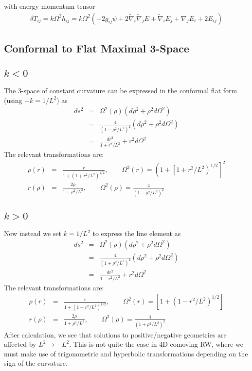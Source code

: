 \documentclass[10pt,letterpaper]{article}
\numberwithin{equation}{section}
\begin{document}
with energy momentum tensor
\begin{eqnarray}
\delta T_{ij} = k\Omega^2 h_{ij}= k \Omega^2 (-2 g_{ij}\psi + 2\tilde\nabla_i\tilde\nabla_j E + \tilde\nabla_i E_j + \nabla_j E_i + 2E_{ij})
\end{eqnarray}
\newpage
\begin{appendices}
\section{Conformal to Flat Maximal 3-Space}
\subsection{$k<0$}
The 3-space of constant curvature can be expressed in the conformal flat form (using $-k = 1/L^2$) as
\begin{eqnarray}
ds^2 &=& \Omega^2(\rho)\left( d\rho^2 + \rho^2 d\Omega^2\right)\\
&=& \frac{4}{\left(1-\rho^2/L^2\right)^2}\left( d\rho^2 + \rho^2 d\Omega^2\right)\\
&=& \frac{dr^2}{1+r^2/L^2} + r^2 d\Omega^2
\end{eqnarray}
The relevant transformations are:
\begin{eqnarray}
\rho(r) &=& \frac{r}{1+\left(1+r^2/L^2\right)^{1/2}},\qquad \Omega^2(r) = \left(1+\left[1+r^2/L^2\right)^{1/2}\right]^2
\nonumber\\
r(\rho) &=& \frac{2\rho}{1-\rho^2/L^2},\qquad \Omega^2(\rho) = \frac{4}{\left(1-\rho^2/L^2\right)^2}
\end{eqnarray}

\subsection{$k>0$}
Now instead we set $k = 1/L^2$ to express the line element as
\begin{eqnarray}
ds^2 &=& \Omega^2(\rho)\left( d\rho^2 + \rho^2 d\Omega^2\right)\\
&=& \frac{4}{\left(1+\rho^2/L^2\right)^2}\left( d\rho^2 + \rho^2 d\Omega^2\right)
\label{k>0cf}\\
&=& \frac{dr^2}{1-r^2/L^2} + r^2 d\Omega^2
\end{eqnarray}
The relevant transformations are:
\begin{eqnarray}
\rho(r) &=& \frac{r}{1+\left(1-r^2/L^2\right)^{1/2}},\qquad \Omega^2(r) = \left[1+\left(1-r^2/L^2\right)^{1/2}\right]
\nonumber\\
r(\rho) &=& \frac{2\rho}{1+\rho^2/L^2},\qquad \Omega^2(\rho) = \frac{4}{\left(1+\rho^2/L^2\right)^2}
\end{eqnarray}
After calculation, we see that solutions to positive/negative geometries are affected by $L^2 \to - L^2$. This is not quite the case in 4D comoving RW, where we must make use of trigonometric and hyperbolic transformations depending on the sign of the curvature.



\end{appendices}
\end{document}
